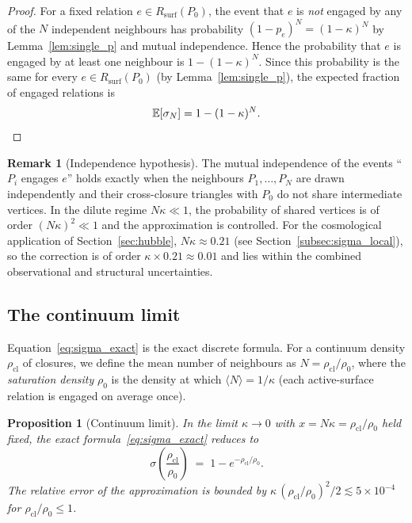 \documentclass[11pt,a4paper]{article}
\newtheorem{proposition}[theorem]{Proposition}
\theoremstyle{definition}
\newtheorem{remark}[theorem]{Remark}
\newcommand{\Rsurf}{R_{\mathrm{surf}}}
\newcommand{\kap}{\kappa}
\newcommand{\sig}{\sigma}
\newcommand{\rhocl}{\rho_{\mathrm{cl}}}
\newcommand{\rhoO}{\rho_0}
\begin{document}
\begin{proof}
For a fixed relation $e \in \Rsurf(P_0)$, the event that $e$ is \emph{not} engaged by any of the $N$ independent neighbours has probability $(1-p_e)^N = (1-\kap)^N$ by Lemma~\ref{lem:single_p} and mutual independence. Hence the probability that $e$ is engaged by at least one neighbour is $1-(1-\kap)^N$. Since this probability is the same for every $e \in \Rsurf(P_0)$ (by Lemma~\ref{lem:single_p}), the expected fraction of engaged relations is
\[
  \mathbb{E}[\sig_N] = 1-(1-\kap)^N. \qedhere
\]
\end{proof}

\begin{remark}[Independence hypothesis]
\label{rem:independence}
The mutual independence of the events ``$P_i$ engages $e$'' holds exactly when the neighbours $P_1,\ldots,P_N$ are drawn independently and their cross-closure triangles with $P_0$ do not share intermediate vertices. In the dilute regime $N\kap \ll 1$, the probability of shared vertices is of order $(N\kap)^2 \ll 1$ and the approximation is controlled. For the cosmological application of Section~\ref{sec:hubble}, $N\kap \approx 0.21$ (see Section~\ref{subsec:sigma_local}), so the correction is of order $\kap \times 0.21 \approx 0.01$ and lies within the combined observational and structural uncertainties.
\end{remark}

\subsection{The continuum limit}
\label{subsec:continuum}

Equation~\eqref{eq:sigma_exact} is the exact discrete formula. For a continuum density $\rhocl$ of closures, we define the mean number of neighbours as $N = \rhocl/\rhoO$, where the \emph{saturation density} $\rhoO$ is the density at which $\langle N \rangle = 1/\kap$ (each active-surface relation is engaged on average once).

\begin{proposition}[Continuum limit]
\label{prop:continuum}
In the limit $\kap \to 0$ with $x = N\kap = \rhocl/\rhoO$ held fixed, the exact formula~\eqref{eq:sigma_exact} reduces to
\begin{equation}
  \label{eq:sigma_continuum}
  \sig\!\left(\frac{\rhocl}{\rhoO}\right) \;=\; 1 - e^{-\rhocl/\rhoO}.
\end{equation}
The relative error of the approximation is bounded by $\kap\,(\rhocl/\rhoO)^2/2 \lesssim 5 \times 10^{-4}$ for $\rhocl/\rhoO \leq 1$.
\end{proposition}
\end{document}
